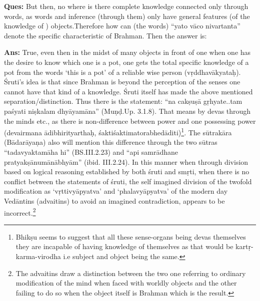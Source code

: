 \vskip -2pt



\textbf{Ques:}  But then, no where is there complete knowledge connected only through words, as words and inference (through them) only have general features (of the knowledge of ) objects.Therefore how can (the words) “yato vāco nivartanta” denote the specific characteristic of Brahman. Then the answer is: 

\textbf{Ans:} True, even then in the midst of many objects in front of one when one has the desire to know which one is a pot, one gets the total specific knowledge of a pot from the words ‘this is a pot’ of a reliable wise person (vṛddhavākyataḥ). Śruti’s idea is that since Brahman is beyond the perception of the senses one cannot have that kind of a knowledge. Śruti itself has made the above mentioned separation/distinction. Thus there is the statement:  “na cakṣuṣā gṛhyate..tam paśyati niṣkalam dhyāyamāna” (Muṇḍ.Up. 3.1.8). That means by devas through the minds etc., as there is non-difference between power and one possessing power (devairmana ādibhirityarthaḥ, śaktiśaktimatorabhedāditi)\footnote{Bhikṣu seems to suggest that all these sense-organs being devas themselves they are incapable of having knowledge of themselves as that would be kartṛ-karma-virodha i.e subject and object being the same.}. The sūtrakāra (Bādarāyaṇa) also will mention this difference through the two sūtras “tadavyaktamāha hi” (BS.III.2.23) and “api samrādhane pratyakṣānumānābhyām” (ibid. III.2.24). In this manner when through division based on logical reasoning established by both śruti and smṛti, when there is no conflict between the statements of śruti, the self imagined division of the twofold modification as ‘vṛttivyāpyatva’ and ‘phalavyāpyatva’ of the modern day Vedāntins (advaitins) to avoid an imagined contradiction, appears to be incorrect.\footnote{The advaitins draw a distinction between the two one referring to ordinary modification of the mind when faced with worldly objects and the other failing to do so when the object itself is Brahman which is the result.}

